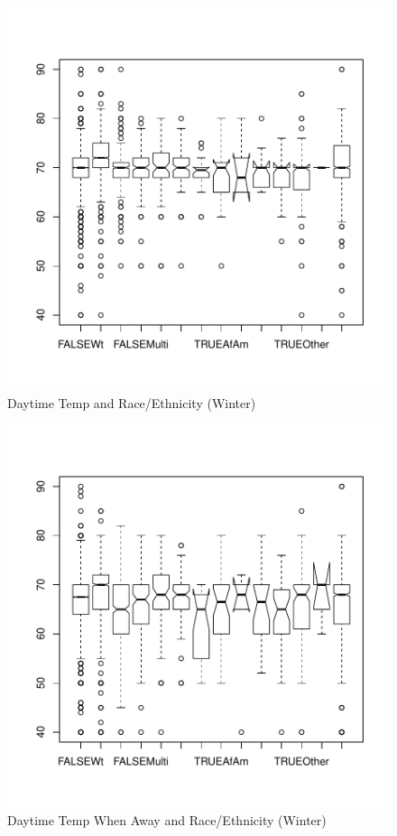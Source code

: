 \documentclass{article}
\begin{document}
\begin{figure}
\begin{center}
\caption{Daytime Temp and Race/Ethnicity (Winter)}
\label{fig:TempHomeRace}
\includegraphics{DraftEdwardsWoods-015}
\end{center}
\end{figure}

\begin{figure}
\begin{center}
\caption{Daytime Temp When Away and Race/Ethnicity (Winter)}
\label{fig:DayAwayRace}
\includegraphics{DraftEdwardsWoods-016}
\end{center}
\end{figure}
\end{document}
